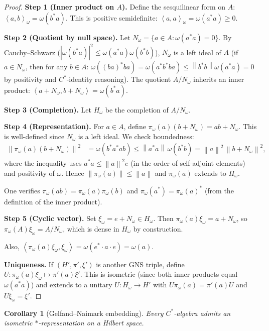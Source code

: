 \documentclass[a4paper,12pt]{book}
\newcommand{\norm}[1]{\left\| #1 \right\|}
\newcommand{\abs}[1]{\left| #1 \right|}
\newcommand{\inner}[2]{\left\langle #1, #2 \right\rangle}
\theoremstyle{definition}
\theoremstyle{plain}
\newtheorem{corollary}[definition]{Corollary}
\theoremstyle{remark}
\begin{document}
\begin{proof}
\textbf{Step 1 (Inner product on $A$).} Define the sesquilinear form on $A$:
$\inner{a}{b}_\omega = \omega(b^*a)$. This is positive semidefinite:
$\inner{a}{a}_\omega = \omega(a^*a) \ge 0$.

\textbf{Step 2 (Quotient by null space).} Let
$N_\omega = \{a \in A : \omega(a^*a) = 0\}$. By Cauchy--Schwarz
($\abs{\omega(b^*a)}^2 \le \omega(a^*a)\omega(b^*b)$), $N_\omega$ is a left
ideal of $A$ (if $a \in N_\omega$, then for any $b \in A$:
$\omega((ba)^*ba) = \omega(a^*b^*ba) \le \norm{b^*b}\omega(a^*a) = 0$
by positivity and $C^*$-identity reasoning). The quotient $A / N_\omega$
inherits an inner product:
$\inner{a + N_\omega}{b + N_\omega} = \omega(b^*a)$.

\textbf{Step 3 (Completion).} Let $H_\omega$ be the completion of $A / N_\omega$.

\textbf{Step 4 (Representation).} For $a \in A$, define
$\pi_\omega(a)(b + N_\omega) = ab + N_\omega$. This is well-defined since
$N_\omega$ is a left ideal. We check boundedness:
\begin{align*}
  \norm{\pi_\omega(a)(b + N_\omega)}^2
  &= \omega(b^*a^*ab) \le \norm{a^*a}\, \omega(b^*b)
  = \norm{a}^2\, \norm{b + N_\omega}^2,
\end{align*}
where the inequality uses $a^*a \le \norm{a}^2 e$ (in the order of self-adjoint
elements) and positivity of $\omega$. Hence $\norm{\pi_\omega(a)} \le \norm{a}$
and $\pi_\omega(a)$ extends to $H_\omega$.

One verifies $\pi_\omega(ab) = \pi_\omega(a)\pi_\omega(b)$ and
$\pi_\omega(a^*) = \pi_\omega(a)^*$ (from the definition of the inner product).

\textbf{Step 5 (Cyclic vector).} Set $\xi_\omega = e + N_\omega \in H_\omega$.
Then $\pi_\omega(a)\xi_\omega = a + N_\omega$, so
$\pi_\omega(A)\xi_\omega = A/N_\omega$, which is dense in $H_\omega$ by
construction.

Also, $\inner{\pi_\omega(a)\xi_\omega}{\xi_\omega} = \omega(e^*\cdot a \cdot e) = \omega(a)$.

\textbf{Uniqueness.} If $(H', \pi', \xi')$ is another GNS triple, define
$U \colon \pi_\omega(a)\xi_\omega \mapsto \pi'(a)\xi'$. This is isometric
(since both inner products equal $\omega(a^*a)$) and extends to a unitary
$U \colon H_\omega \to H'$ with $U\pi_\omega(a) = \pi'(a)U$ and $U\xi_\omega = \xi'$.
\end{proof}

\begin{corollary}[Gelfand--Naimark embedding]\label{cor:gn-embedding}
Every $C^*$-algebra admits an isometric $*$-representation on a Hilbert space.
\end{corollary}
\end{document}
